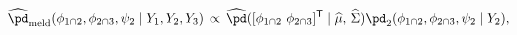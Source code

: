 \begin{equation}
\begin{gathered}
  \widehat{\pd}_{\text{meld}} (\phi_{1 \cap 2}, \phi_{2 \cap 3}, \psi_{2} \mid Y_{1}, Y_{2}, Y_{3})
  \, \propto \,
  \widehat{\pd}([\phi_{1 \cap 2} \,\, \phi_{2 \cap 3}]^{\mathsf{T}} \mid \widehat{\mu}, \, \widehat{\Sigma})
  \pd_{2}(\phi_{1 \cap 2}, \phi_{2 \cap 3}, \psi_{2} \mid Y_{2}),
\end{gathered}
\label{eqn:final-normal-approx}
\end{equation}